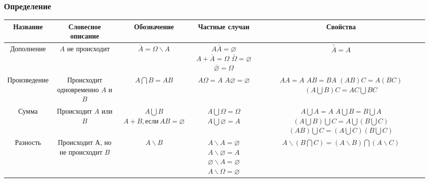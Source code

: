 \subsubsection{Определение}
\begin{tabu}[t]{||c|c|c|c|c||}
	\hline
		Название & Словесное описание & Обозначение & Частные случаи & Свойства \\
	\hline
		Дополнение &
		$A$ не происходит &
		$\displaystyle \bar{A} = \Omega \backslash A $ &
		 &
		$\displaystyle \bar{\bar{A}} = A $ \\
	\hline
		Произведение &
		Происходит одновременно $A$ и $B$ &
		$\displaystyle A\bigcap B = AB $ &
		 &
		 \\
	\hline
		Сумма &
		Происходит $A$ или $B$ &
		 &
		 &
		 \\
	\hline
		Разность &
		Происходит $А$, но не происходит $B$ &
		$\displaystyle A\backslash B $ &
		 &
\end{tabu}
